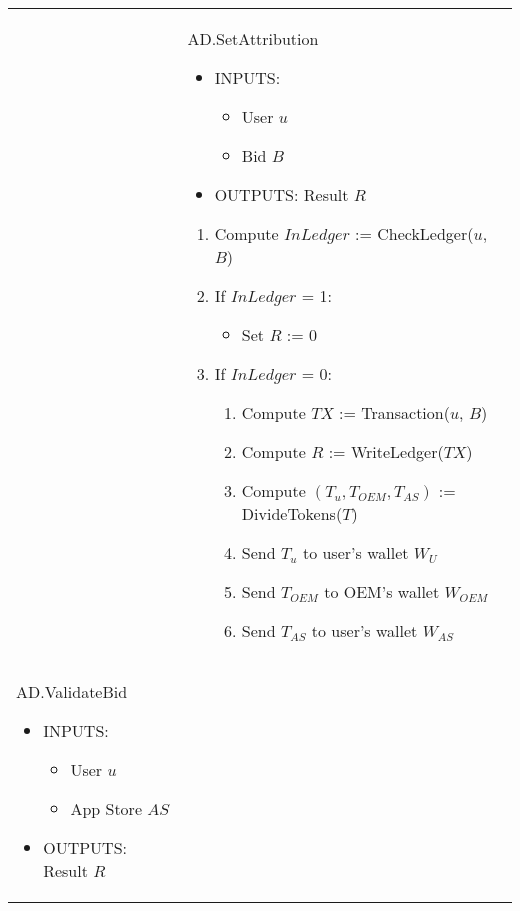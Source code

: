 \begin{table}[H]
\begin{tabular}{|p{}p{}|}
\begin{enumerate}
\begin{enumerate}
\begin{enumerate}
		\end{enumerate}
	\end{enumerate}
\end{enumerate} & \vspace{0.1cm} \textsf{AD.SetAttribution}
\begin{itemize}
	\vspace{-0.3cm}
	\item INPUTS:
	\vspace{-0.4cm}
	\begin{itemize}
		\item User $u$
		\item Bid $B$
	\end{itemize}
	\item OUTPUTS: Result $R$
\end{itemize}
\begin{enumerate}
	\item Compute $InLedger$ := \textsf{CheckLedger}($u$, $B$)
	\item If $InLedger$ = 1:
	\begin{itemize}
		\item Set $R$ := 0
	\end{itemize}
	\item If $InLedger$ = 0:
	\begin{enumerate}
		\item Compute $TX$ := \textsf{Transaction}($u$, $B$)
		\item Compute $R$ := \textsf{WriteLedger}($TX$)
		\item Compute $(T_u, T_{OEM}, T_{AS})$ := \textsf{DivideTokens}($T$)
		\item Send $T_u$ to user's wallet $W_U$
		\item Send $T_{OEM}$ to OEM's wallet $W_{OEM}$
		\item Send $T_{AS}$ to user's wallet $W_{AS}$
	\end{enumerate}
\end{enumerate} \\
\textsf{AD.ValidateBid}
\begin{itemize}
	\vspace{-0.3cm}
	\item INPUTS:
	\vspace{-0.4cm}
	\begin{itemize}
		\item User $u$
		\item App Store $AS$
	\end{itemize}
	\item OUTPUTS: Result $R$

\end{itemize}
\end{tabular}
\end{table}
